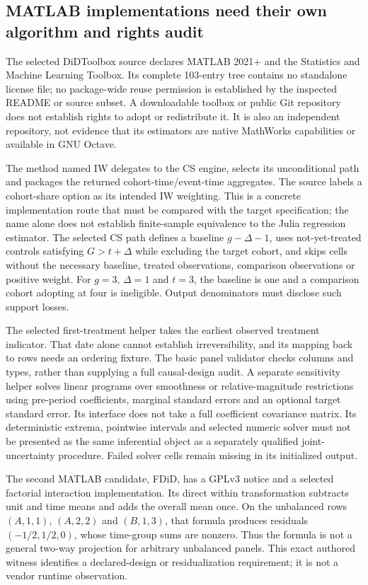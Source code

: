 \subsection{MATLAB implementations need their own algorithm and rights audit}
The selected DiDToolbox source declares MATLAB 2021+ and the Statistics and
Machine Learning Toolbox. Its complete 103-entry tree contains no standalone
license file; no package-wide reuse permission is established by the inspected
README or source subset. A downloadable toolbox or public Git repository
does not establish rights to adopt or redistribute it. It is also an
independent repository, not evidence that its estimators are native
MathWorks capabilities or available in GNU Octave.\citep{exec25_panelother_matlab}

The method named IW delegates to the CS engine, selects its unconditional
path and packages the returned cohort-time/event-time aggregates. The source
labels a cohort-share option as its intended IW weighting. This is a concrete
implementation route that must be compared with the target specification;
the name alone does not establish finite-sample equivalence to the Julia
regression estimator. The selected CS path defines a baseline
$g-\Delta-1$, uses not-yet-treated controls satisfying $G>t+\Delta$
while excluding the target cohort, and skips cells without the necessary
baseline, treated observations, comparison observations or positive weight.
For $g=3$, $\Delta=1$ and $t=3$, the baseline is one and a comparison cohort
adopting at four is ineligible. Output denominators must disclose such
support losses.\citep{exec25_panelother_matlab,exec25_panelother_choice}

The selected first-treatment helper takes the earliest observed treatment
indicator. That date alone cannot establish irreversibility, and its mapping
back to rows needs an ordering fixture. The basic panel validator checks
columns and types, rather than supplying a full causal-design audit. A
separate sensitivity helper solves linear programs over smoothness or
relative-magnitude restrictions using pre-period coefficients, marginal
standard errors and an optional target standard error. Its interface does
not take a full coefficient covariance matrix. Its deterministic extrema,
pointwise intervals and selected numeric solver must not be presented as
the same inferential object as a separately qualified joint-uncertainty
procedure. Failed solver cells remain missing in its initialized output.
\citep{exec25_panelother_matlab}

The second MATLAB candidate, FDiD, has a GPLv3 notice and a selected factorial
interaction implementation. Its direct within transformation subtracts unit
and time means and adds the overall mean once. On the unbalanced rows
$(A,1,1)$, $(A,2,2)$ and $(B,1,3)$, that formula produces residuals
$(-1/2,1/2,0)$, whose time-group sums are nonzero. Thus the formula is not
a general two-way projection for arbitrary unbalanced panels. This exact
authored witness identifies a declared-design or residualization requirement;
it is not a vendor runtime observation.\citep{exec25_panelother_matlab,exec25_panelother_choice}

